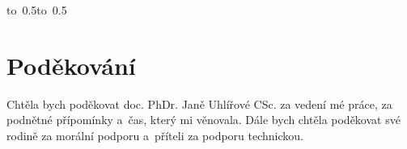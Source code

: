 \documentclass[12pt,a4paper,singleside,openright]{report}
\let\openright=\cleardoublepage
\begin{document}
	\vspace{10mm}

	\hbox{\hbox to 0.5\hbox to 0.5}

	\vspace{20mm}
\newpage

	\openright

	\textcolor{white}{ }
	\vspace{150mm}

	\section*{Poděkování}

	Chtěla bych poděkovat doc. PhDr. Janě Uhlířové CSc. za vedení mé práce, za podnětné přípomínky a~čas, který mi věnovala.
	Dále bych chtěla poděkovat své rodině za morální podporu a~příteli za podporu technickou. 

\newpage

\end{document}

